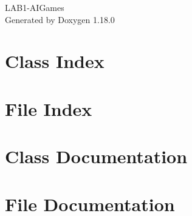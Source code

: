 \documentclass[twoside]{book}
\newcommand{\+}{\discretionary{\mbox{\scriptsize$\hookleftarrow$}}{}{}}
\newcommand{\clearemptydoublepage}{%
    \newpage{\pagestyle{empty}\cleardoublepage}%
  }
\begin{document}
  \raggedbottom
    \hypersetup{pageanchor=false,
                bookmarksnumbered=true,
                pdfencoding=unicode
               }
  \begin{titlepage}
  \vspace*{7cm}
  \begin{center}%
  {\Large LAB1-\/\+AIGames}\\
  \vspace*{1cm}
  {\large Generated by Doxygen 1.18.0}\\
  \end{center}
  \end{titlepage}
  \clearemptydoublepage
  \tableofcontents
  \clearemptydoublepage
  \hypersetup{pageanchor=true}
\chapter{Class Index}

\chapter{File Index}

\chapter{Class Documentation}

\chapter{File Documentation}

  \backmatter
  \newpage
  \clearemptydoublepage
  \printindex
\end{document}
